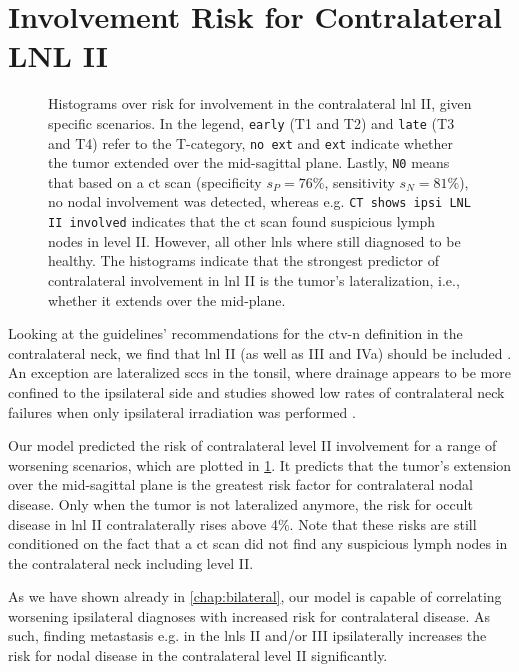 \documentclass[\relativeRoot/main.tex]{subfiles}
\begin{document}
\section{Involvement Risk for Contralateral LNL II}
\label{sec:complete:contraII}

\begin{figure}
    \centering
    \def\svgwidth{1.0\textwidth}
    
    \caption[
        Complete model's risk predictions for contralateral LNL II
    ]{
        Histograms over risk for involvement in the contralateral \gls{lnl} II, given specific scenarios. In the legend, \texttt{early} (T1 and T2) and \texttt{late} (T3 and T4) refer to the T-category, \texttt{no ext} and \texttt{ext} indicate whether the tumor extended over the mid-sagittal plane. Lastly, \texttt{N0} means that based on a \gls{ct} scan (specificity $s_P = 76\%$, sensitivity $s_N = 81\%$), no nodal involvement was detected, whereas e.g. \texttt{CT shows ipsi LNL II involved} indicates that the \gls{ct} scan found suspicious lymph nodes in level II. However, all other \glspl{lnl} where still diagnosed to be healthy. The histograms indicate that the strongest predictor of contralateral involvement in \gls{lnl} II is the tumor's lateralization, i.e., whether it extends over the mid-plane.
    }
    \label{fig:complete:contraII}
\end{figure}

Looking at the guidelines' recommendations for the \gls{ctv-n} definition in the contralateral neck, we find that \gls{lnl} II (as well as III and IVa) should be included \cite{biau_selection_2019}. An exception are lateralized \glspl{scc} in the tonsil, where drainage appears to be more confined to the ipsilateral side and studies showed low rates of contralateral neck failures when only ipsilateral irradiation was performed \cite{huang_re-evaluation_2017-1}.

Our model predicted the risk of contralateral level II involvement for a range of worsening scenarios, which are plotted in \cref{fig:complete:contraII}. It predicts that the tumor's extension over the mid-sagittal plane is the greatest risk factor for contralateral nodal disease. Only when the tumor is not lateralized anymore, the risk for occult disease in \gls{lnl} II contralaterally rises above 4\%. Note that these risks are still conditioned on the fact that a \gls{ct} scan did not find any suspicious lymph nodes in the contralateral neck including level II.

As we have shown already in \cref{chap:bilateral}, our model is capable of correlating worsening ipsilateral diagnoses with increased risk for contralateral disease. As such, finding metastasis e.g. in the \glspl{lnl} II and/or III ipsilaterally increases the risk for nodal disease in the contralateral level II significantly.
\end{document}
